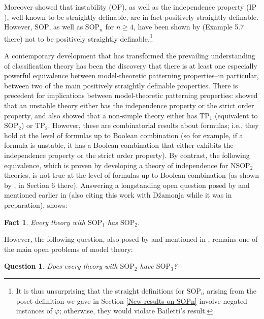 \documentclass[10pt,a4paper]{amsart}
\newcommand{\SOP}{\text{SOP}}
\newcommand{\vphi}{\varphi}
\newtheorem{question}{Question}
\newtheorem{fact}{Fact}
\begin{document}
Moreover \cite{day2025results} showed that instability ($\mathrm{OP}$), as well as the independence property ($\mathrm{IP}$), well-known to be straightly definable, are in fact positively straightly definable. However, $\mathrm{SOP}$, as well as $\mathrm{SOP}_{n}$ for $n \geq 4$, have been shown by \cite{bailetti2024walk} (Example 5.7 there) not to be positively straightly definable.\footnote{It is thus unsurprising that the straight definitions for $\SOP_n$ arising from the poset definition we gave in Section \ref{New results on SOPn} involve negated instances of $\vphi$; otherwise, they would violate Bailetti's result.}

A contemporary development that has transformed the prevailing understanding of classification theory has been the discovery that there is at least one especially powerful equivalence between model-theoretic patterning properties--in particular, between two of the main positively straightly definable properties. There is precedent for implications between model-theoretic patterning properties: \cite{shelah1990classification} showed that an unstable theory either has the independence property or the strict order property, and also showed that a non-simple theory either has $\mathrm{TP}_{1}$ (equivalent to $\mathrm{SOP}_{2}$) or $\mathrm{TP}_{2}$. However, these are combinatorial results about formulas; i.e., they hold at the level of formulas up to Boolean combination (so for example, if a formula is unstable, it has a Boolean combination that either exhibits the independence property or the strict order property). By contrast, the following equivalence, which is proven by developing a theory of independence for $\mathrm{NSOP}_{2}$ theories, is not true at the level of formulas up to Boolean combination (as shown by \cite{AhnKim2024natp}, in Section 6 there). Answering a longstanding open question posed by \cite{Dzamonja2004} and mentioned earlier in \cite{shelah_what_2000} (also citing this work with Džamonja while it was in preparation), \cite{Mutchnik2026nsop2} shows:

\begin{fact}\label{sop1 equals sop2}
 Every theory with $\mathrm{SOP}_{1}$ has $\mathrm{SOP}_{2}$.
\end{fact}


However, the following question, also posed by \cite{Dzamonja2004} and mentioned in \cite{shelah_what_2000}, remains one of the main open problems of model theory:

\begin{question}\label{is sop2 equal to sop3}
    Does every theory with $\mathrm{SOP}_{2}$ have $\mathrm{SOP}_{3}$?
\end{question}
\end{document}
